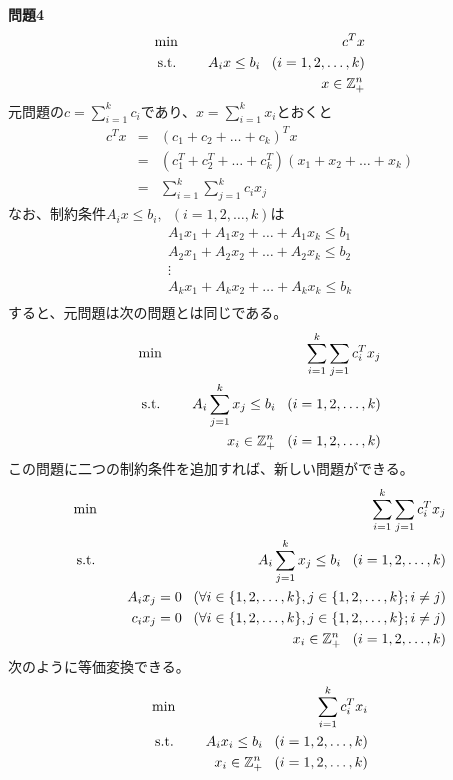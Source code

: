 \documentclass{jsarticle}
\begin{document}
{\bf 問題4}\\
\begin{eqnarray}
\text{min \,\,\,\,\,} && c^Tx \\
\text{s.t. \,\,\,\,\,} && A_ix \le b_i \,\,\,\,\, (i = 1,2,\dots,k) \\
&& x \in \mathbb{Z}_+^n
\end{eqnarray}
元問題の$c=\sum_{i=1}^k c_i$であり、$x=\sum_{i=1}^k x_i$とおくと
\begin{eqnarray}
c^Tx &=& (c_1 + c_2 + \dots + c_k)^Tx\\
&=& (c_1^T + c_2^T + \dots + c_k^T)(x_1 + x_2 + \dots + x_k)\\
&=& \sum_{i=1}^k\sum_{j=1}^k c_ix_j
\end{eqnarray}
なお、制約条件$A_ix \le b_i, \,\,\, (i=1,2,\dots,k)$は
\begin{eqnarray*}
&A_1x_1 + A_1x_2 + \dots + A_1x_k \le b_1& \\
&A_2x_1 + A_2x_2 + \dots + A_2x_k \le b_2 &\\
&\vdots&\\
&A_kx_1 + A_kx_2 + \dots + A_kx_k \le b_k &\\
\end{eqnarray*}
すると、元問題は次の問題とは同じである。
\begin{eqnarray}
\text{min \,\,\,\,\,} && \sum_{i=1}^k \sum_{j=1} c_i^Tx_j \\
\text{s.t. \,\,\,\,\,} && A_i\sum_{j=1}^k x_j \le b_i \,\,\,\,\, (i = 1,2,\dots,k) \\
&& x_i \in \mathbb{Z}_+^n \,\,\,\,\, (i = 1,2,\dots,k)
\end{eqnarray}
この問題に二つの制約条件を追加すれば、新しい問題ができる。
\begin{eqnarray}
\text{min \,\,\,\,\,} && \sum_{i=1}^k \sum_{j=1} c_i^Tx_j \\
\text{s.t. \,\,\,\,\,} && A_i\sum_{j=1}^k x_j \le b_i \,\,\,\,\, (i = 1,2,\dots,k) \\
&& A_ix_j =0 \,\,\,\,\, (\forall i\in \{1,2,\dots,k\}, j\in \{1,2,\dots,k\};i \neq j) \\
&& c_ix_j =0 \,\,\,\,\, (\forall i\in \{1,2,\dots,k\}, j\in \{1,2,\dots,k\};i \neq j) \\
&& x_i \in \mathbb{Z}_+^n \,\,\,\,\, (i = 1,2,\dots,k)
\end{eqnarray}
次のように等価変換できる。
\begin{eqnarray}
\text{min \,\,\,\,\,} && \sum_{i=1}^k c_i^Tx_i \\
\text{s.t. \,\,\,\,\,} && A_ix_i \le b_i \,\,\,\,\, (i = 1,2,\dots,k) \\
&& x_i \in \mathbb{Z}_+^n \,\,\,\,\, (i = 1,2,\dots,k)
\end{eqnarray}
\end{document}
